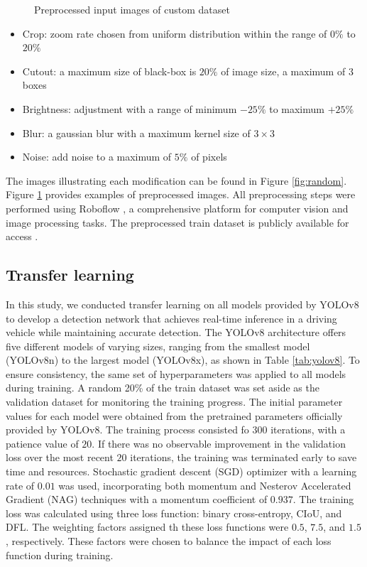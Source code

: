 \begin{figure}[b!]
\caption{Preprocessed input images of custom dataset}
\label{fig:custom_dataset}%
\end{figure}

\begin{itemize}
    \item{Crop: zoom rate chosen from uniform distribution within the range of $0\%$ to $20\%$}
    \item{Cutout: a maximum size of black-box is $20\%$ of image size, a maximum of $3$ boxes}
    \item{Brightness: adjustment with a range of minimum $-25\%$ to maximum $+25\%$}
    \item{Blur: a gaussian blur with a maximum kernel size of $3 \times 3$}
    \item{Noise: add noise to a maximum of $5\%$ of pixels}
\end{itemize}
The images illustrating each modification can be found in Figure \ref{fig:random}.
Figure \ref{fig:custom_dataset} provides examples of preprocessed images.
All preprocessing steps were performed using Roboflow \cite{roboflow}, a comprehensive platform for computer vision and image processing tasks.
The preprocessed train dataset is publicly available for access \cite{brake-light-detection_dataset}.




\subsection{Transfer learning}
\label{sec:exp_transfer}
In this study, we conducted transfer learning on all models provided by YOLOv8 \cite{YOLOv8} to develop a detection network that achieves real-time inference in a driving vehicle while maintaining accurate detection.
The YOLOv8 architecture offers five different models of varying sizes, ranging from the smallest model (YOLOv8n) to the largest model (YOLOv8x), as shown in Table \ref{tab:yolov8}.
To ensure consistency, the same set of hyperparameters was applied to all models during training.
A random 20\% of the train dataset was set aside as the validation dataset for monitoring the training progress.
The initial parameter values for each model were obtained from the pretrained parameters officially provided by YOLOv8.
The training process consisted fo $300$ iterations, with a patience value of $20$.
If there was no observable improvement in the validation loss over the most recent $20$ iterations, the training was terminated early to save time and resources.
Stochastic gradient descent (SGD) optimizer with a learning rate of $0.01$ was used, incorporating both momentum and Nesterov Accelerated Gradient (NAG) techniques \cite{sutskever2013importance} with a momentum coefficient of $0.937$.
The training loss was calculated using three loss function: binary cross-entropy, CIoU, and DFL.
The weighting factors assigned th these loss functions were $0.5$, $7.5$, and $1.5$, respectively.
These factors were chosen to balance the impact of each loss function during training.

